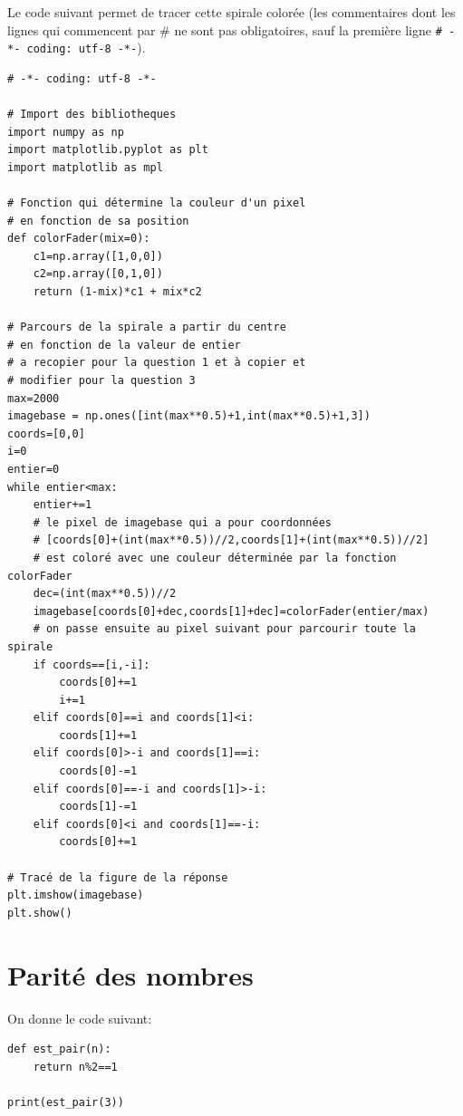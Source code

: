 Le code suivant permet de tracer cette spirale colorée (les commentaires dont les lignes qui commencent par \# ne sont pas obligatoires, sauf la première ligne \texttt{\# -*- coding: utf-8 -*-}).
 
\newpage

\begin{verbatim}
# -*- coding: utf-8 -*-

# Import des bibliotheques
import numpy as np
import matplotlib.pyplot as plt
import matplotlib as mpl

# Fonction qui détermine la couleur d'un pixel
# en fonction de sa position
def colorFader(mix=0):
    c1=np.array([1,0,0])
    c2=np.array([0,1,0])
    return (1-mix)*c1 + mix*c2

# Parcours de la spirale a partir du centre
# en fonction de la valeur de entier
# a recopier pour la question 1 et à copier et
# modifier pour la question 3
max=2000
imagebase = np.ones([int(max**0.5)+1,int(max**0.5)+1,3])
coords=[0,0]
i=0
entier=0
while entier<max:
    entier+=1
    # le pixel de imagebase qui a pour coordonnées
    # [coords[0]+(int(max**0.5))//2,coords[1]+(int(max**0.5))//2]
    # est coloré avec une couleur déterminée par la fonction colorFader
    dec=(int(max**0.5))//2
    imagebase[coords[0]+dec,coords[1]+dec]=colorFader(entier/max)
    # on passe ensuite au pixel suivant pour parcourir toute la spirale
    if coords==[i,-i]:
        coords[0]+=1
        i+=1
    elif coords[0]==i and coords[1]<i:
        coords[1]+=1
    elif coords[0]>-i and coords[1]==i:
        coords[0]-=1
    elif coords[0]==-i and coords[1]>-i:
        coords[1]-=1
    elif coords[0]<i and coords[1]==-i:
        coords[0]+=1

# Tracé de la figure de la réponse
plt.imshow(imagebase)
plt.show()
\end{verbatim}


\section{Parité des nombres}

On donne le code suivant:
\begin{verbatim}
def est_pair(n):
    return n%2==1

print(est_pair(3))
\end{verbatim}

